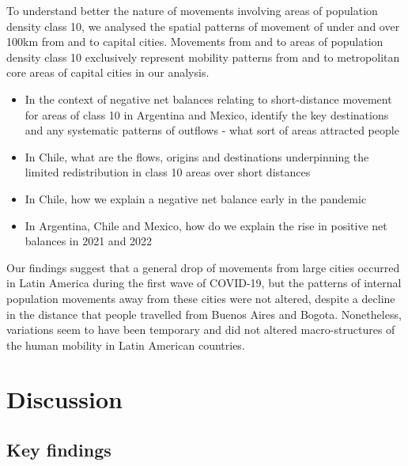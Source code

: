 \documentclass[
  10pt,
  letterpaper,
  DIV=11,
  numbers=noendperiod]{scrartcl}
\begin{document}
To understand better the nature of movements involving areas of
population density class 10, we analysed the spatial patterns of
movement of under and over 100km from and to capital cities. Movements
from and to areas of population density class 10 exclusively represent
mobility patterns from and to metropolitan core areas of capital cities
in our analysis.

\begin{itemize}
\item
  In the context of negative net balances relating to short-distance
  movement for areas of class 10 in Argentina and Mexico, identify the
  key destinations and any systematic patterns of outflows - what sort
  of areas attracted people
\item
  In Chile, what are the flows, origins and destinations underpinning
  the limited redistribution in class 10 areas over short distances
\item
  In Chile, how we explain a negative net balance early in the pandemic
\item
  In Argentina, Chile and Mexico, how do we explain the rise in positive
  net balances in 2021 and 2022
\end{itemize}

Our findings suggest that a general drop of movements from large cities
occurred in Latin America during the first wave of COVID-19, but the
patterns of internal population movements away from these cities were
not altered, despite a decline in the distance that people travelled
from Buenos Aires and Bogota. Nonetheless, variations seem to have been
temporary and did not altered macro-structures of the human mobility in
Latin American countries.

\hypertarget{discussion}{%
\section{Discussion}\label{discussion}}

\hypertarget{key-findings}{%
\subsection{Key findings}\label{key-findings}}
\end{document}
